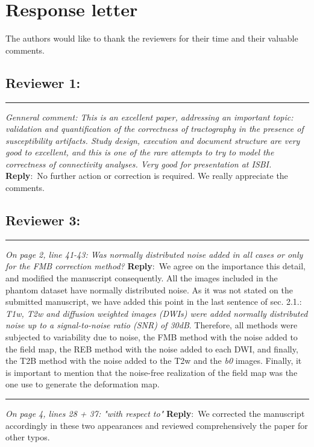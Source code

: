 \documentclass[letter]{memoir}
\newcommand{\pointRaised}[2]{\medskip \hrule \noindent 
               \textsl{{\fontseries{b}\selectfont #1}: #2}}
\newcommand{\reply}{\noindent \textbf{Reply}:\ }
\begin{document}
\section*{Response letter}

The authors would like to thank the reviewers for their time and their valuable comments.

\subsection*{Reviewer 1:}
\pointRaised{Genneral comment}%
{This is an excellent paper, addressing an important topic:
  validation and quantification of the correctness of 
  tractography in the presence of susceptibility artifacts.
Study design, execution and document structure are very good to excellent,
  and this is one of the rare attempts to try to model the correctness of
  connectivity analyses.
Very good for presentation at ISBI.}
\reply{No further action or correction is required.
We really appreciate the comments.}

\subsection*{Reviewer 3:}
\pointRaised{On page 2, line 41-43}{Was normally distributed noise added
in all cases or only for the FMB correction method?}
\reply{We agree on the importance this detail, and modified the
manuscript consequently.
All the images included in the phantom dataset have normally distributed
  noise.
As it was not stated on the submitted manuscript, we have added this point
  in the last sentence of sec. 2.1.:
\emph{T1w, T2w and diffusion weighted images (DWIs) were added normally distributed
  noise up to a signal-to-noise ratio (SNR) of 30dB}.
Therefore, all methods were subjected to variability due to noise, the FMB method
  with the noise added to the field map, the REB method with the noise added to
  each DWI, and finally, the T2B method with the noise added to the T2w and the
  \emph{b0} images.
Finally, it is important to mention that the noise-free realization of the field map
  was the one use to generate the deformation map.}
  
\pointRaised{On page 4, lines 28 + 37}{"with respect to"}
\reply{We corrected the manuscript accordingly in these two appearances
and reviewed comprehensively the paper for other typos.}
\end{document}
